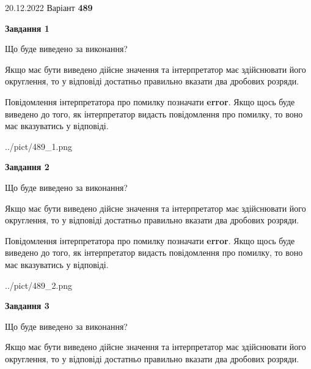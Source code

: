 \documentclass[12pt, ukrainian]{article}
\begin{document}
{20.12.2022 Варіант \No \textbf { 489 }\par}
{
\begin {Large}

{\begin {center}\textbf{Завдання 1}\end {center}}\par
Що буде виведено за виконання? \par

Якщо має бути виведено дійсне значення та інтерпретатор має здійснювати його округлення, 
то у відповіді достатньо правильно вказати два дробових розряди.

Повідомлення інтерпретатора про помилку позначати \textbf{error}.
Якщо щось буде виведено до того, як інтерпретатор видасть повідомлення про помилку, 
то воно має вказуватись у відповіді. \par

\begin{center}
	{../pict/489_1.png}
\end{center}
\newpage

{\begin {center}\textbf{Завдання 2}\end {center}}\par
Що буде виведено за виконання? \par

Якщо має бути виведено дійсне значення та інтерпретатор має здійснювати його округлення, 
то у відповіді достатньо правильно вказати два дробових розряди.

Повідомлення інтерпретатора про помилку позначати \textbf{error}.
Якщо щось буде виведено до того, як інтерпретатор видасть повідомлення про помилку, 
то воно має вказуватись у відповіді. \par

\begin{center}
	{../pict/489_2.png}
\end{center}
\newpage

{\begin {center}\textbf{Завдання 3}\end {center}}\par
Що буде виведено за виконання? \par

Якщо має бути виведено дійсне значення та інтерпретатор має здійснювати його округлення, 
то у відповіді достатньо правильно вказати два дробових розряди.


\end{Large}}
\end{document}
